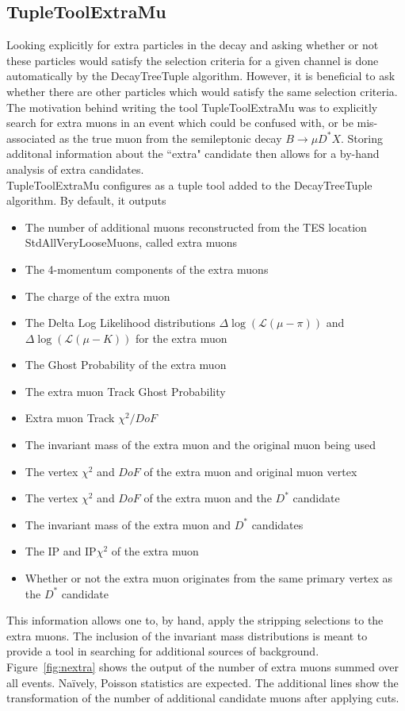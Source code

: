 \documentclass[11pt]{article}%
\begin{document}
\begin{flushleft}
\begin{linenumbers}
\section{TupleToolExtraMu}
Looking explicitly for extra particles in the decay and asking whether or not these particles would satisfy the selection criteria for a given channel is done automatically by the DecayTreeTuple algorithm. However, it is beneficial to ask whether there are other particles which would satisfy the same selection criteria. The motivation behind writing the tool TupleToolExtraMu was to explicitly search for extra muons in an event which could be confused with, or be mis-associated as the true muon from the semileptonic decay $B\to \mu D^* X$. Storing additonal information about the ``extra" candidate then allows for a by-hand analysis of extra candidates.\\
TupleToolExtraMu configures as a tuple tool added to the DecayTreeTuple algorithm. By default, it outputs
\begin{itemize}
	\item The number of additional muons reconstructed from the TES location StdAllVeryLooseMuons, called extra muons
	\item The 4-momentum components of the extra muons
	\item The charge of the extra muon
	\item The Delta Log Likelihood distributions $\Delta \log( \mathcal{L}(\mu-\pi))$ and  $\Delta \log( \mathcal{L}(\mu-K))$ for the extra muon
	\item The Ghost Probability of the extra muon
	\item The extra muon Track Ghost Probability
	\item Extra muon Track $\chi^2/DoF$
	\item The invariant mass of the extra muon and the original muon being used
	\item The vertex $\chi^2$ and $DoF$ of the extra muon and original muon vertex
	\item The vertex $\chi^2$ and $DoF$ of the extra muon and the $D^*$ candidate
	\item The invariant mass of the extra muon and $D^*$ candidates
	\item The IP and IP$\chi^2$ of the extra muon
	\item Whether or not the extra muon originates from the same primary vertex as the $D^*$ candidate
\end{itemize}
This information allows one to, by hand, apply the stripping selections to the extra muons. The inclusion of the invariant mass distributions is meant to provide a tool in searching for additional sources of background. Figure~\ref{fig:nextra} shows the output of the number of extra muons summed over all events. Na\"ively, Poisson statistics are expected. The additional lines show the transformation of the number of additional candidate muons after applying cuts.


\end{linenumbers}
\end{flushleft}
\end{document}
